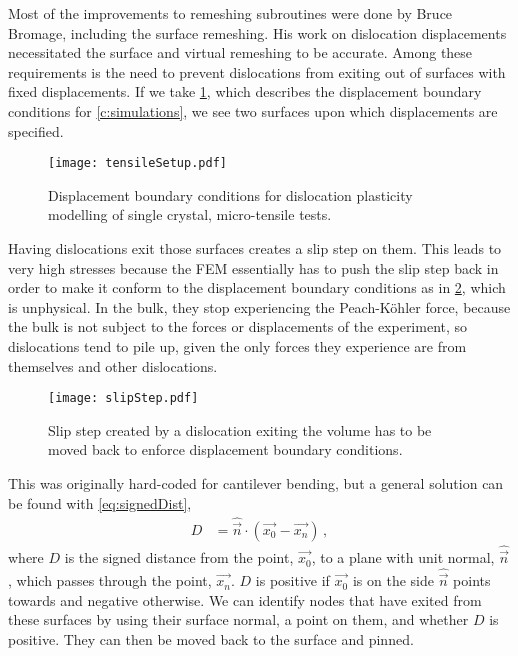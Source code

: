 Most of the improvements to remeshing subroutines were done by Bruce Bromage, including the surface remeshing. His work on dislocation displacements necessitated the surface and virtual remeshing to be accurate. Among these requirements is the need to prevent dislocations from exiting out of surfaces with fixed displacements. If we take \cref{f:tensileSetupTop}, which describes the displacement boundary conditions for \cref{c:simulations}, we see two surfaces upon which displacements are specified.
\begin{figure}
    \centering
    \texttt{[image: tensileSetup.pdf]}
    \caption[Displacement boundary conditions for dislocation plasticity modelling of single crystal, micro-tensile tests.]{Displacement boundary conditions for dislocation plasticity modelling of single crystal, micro-tensile tests.}
    \label{f:tensileSetupTop}
\end{figure}
Having dislocations exit those surfaces creates a slip step on them. This leads to very high stresses because the FEM essentially has to push the slip step back in order to make it conform to the displacement boundary conditions as in \cref{f:slipStep}, which is unphysical. In the bulk, they stop experiencing the Peach-K\"{o}hler force, because the bulk is not subject to the forces or displacements of the experiment, so dislocations tend to pile up, given the only forces they experience are from themselves and other dislocations.
\begin{figure}
    \centering
    \texttt{[image: slipStep.pdf]}
    \caption{Slip step created by a dislocation exiting the volume has to be moved back to enforce displacement boundary conditions.}
    \label{f:slipStep}
\end{figure}

This was originally hard-coded for cantilever bending, but a general solution can be found with \cref{eq:signedDist},
\begin{align}\label{eq:signedDist}
    D & = \hat{\vec{n}} \cdot (\vec{x_0} - \vec{x_n})\,,
\end{align}
where $D$ is the signed distance from the point, $\vec{x_0}$, to a plane with unit normal, $\hat{\vec{n}}$, which passes through the point, $\vec{x_n}$. $D$ is positive if $\vec{x_0}$ is on the side $\hat{\vec{n}}$ points towards and negative otherwise. We can identify nodes that have exited from these surfaces by using their surface normal, a point on them, and whether $D$ is positive. They can then be moved back to the surface and pinned.

